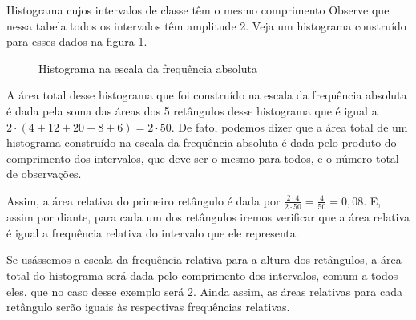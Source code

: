 {\begin{example}{Histograma cujos intervalos de classe têm o mesmo comprimento}
Observe que nessa tabela todos os intervalos têm amplitude 2. Veja um histograma construído para esses dados na \hyperref[est1-fig-17]{figura \ref{est1-fig-17}}.

\begin{figure}[H]
\centering
\capstart

\noindent
{}

\caption{Histograma na escala da frequência absoluta}
\label{est1-fig-17}
\end{figure}

A área total desse histograma que foi construído na escala da frequência absoluta é dada pela soma das áreas dos 5 retângulos desse histograma que é igual a $2\cdot(4+12+20+8+6)=2\cdot50$. De fato, podemos dizer que a área total de um histograma construído na escala da frequência absoluta é dada pelo produto do comprimento dos intervalos, que deve ser o mesmo para todos, e o número total de observações.

Assim, a área relativa do primeiro retângulo é dada por $\displaystyle\frac{2\cdot4}{2\cdot50}=\frac{4}{50}=0{,}08$. E, assim por diante, para cada um dos retângulos iremos verificar que a área relativa é igual a frequência relativa do intervalo que ele representa.

Se usássemos a escala da frequência relativa para a altura dos retângulos, a área total do histograma será dada pelo comprimento dos intervalos, comum a todos eles, que no caso desse exemplo será 2. Ainda assim, as áreas relativas para cada retângulo serão iguais às respectivas frequências relativas.
\end{example}

}
